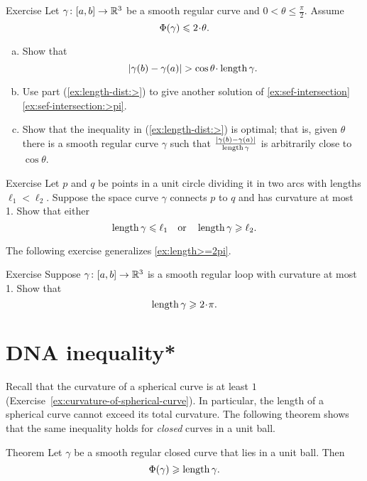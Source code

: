 \begin{thm}{Exercise}\label{ex:length-dist}
Let $\gamma\colon[a,b]\to \mathbb{R}^3$ be a smooth regular curve and $0<\theta\le\tfrac\pi2$.
Assume 
\[\tc\gamma\le 2\cdot\theta.\]
\begin{enumerate}[(a)]
\item\label{ex:length-dist:>} Show that 
\[|\gamma(b)-\gamma(a)|> \cos\theta\cdot\length\gamma.\]
\item Use part (\ref{ex:length-dist:>}) to give another solution of \ref{ex:sef-intersection}\ref{ex:sef-intersection:>pi}.
\item Show that the inequality in (\ref{ex:length-dist:>}) is optimal; that is, given 
$\theta$ there is a smooth regular curve $\gamma$ such that $\frac{|\gamma(b)-\gamma(a)|}{\mathop{\rm length}\nolimits\gamma}$ is arbitrarily close to $\cos\theta$.

\end{enumerate}

\end{thm}



\begin{thm}{Exercise}\label{ex:schwartz}
Let $p$ and $q$ be points in a unit circle dividing it in two arcs with lengths $\ell_1<\ell_2$.
Suppose the space curve $\gamma$ connects $p$ to $q$ and has curvature at most 1. Show that either
\[\mathop{\rm length}\nolimits \gamma\leqslant \ell_1
\quad\text{or}\quad
\mathop{\rm length}\nolimits \gamma\geqslant \ell_2.
\]
\end{thm} %

The following exercise generalizes \ref{ex:length>=2pi}.

\begin{thm}{Exercise}\label{ex:loop}
Suppose $\gamma\colon[a,b]\to \mathbb{R}^3$ is a smooth regular loop with curvature at most 1.
Show that 
\[\length\gamma\ge2\cdot\pi.\]

\end{thm}


\section*{DNA inequality*}

Recall that the curvature of a spherical curve is at least $1$
(Exercise~\ref{ex:curvature-of-spherical-curve}).
In particular, the length of a spherical curve cannot exceed its total curvature.
The following theorem shows that the same inequality holds for \emph{closed} curves in a unit ball.

\begin{thm}{Theorem}\label{thm:DNA}
Let $\gamma$ be a smooth regular closed curve that lies in a unit ball.
Then 
\[\Phi({\gamma})\geqslant \mathop{\rm length}\nolimits\gamma.\]

\end{thm}

